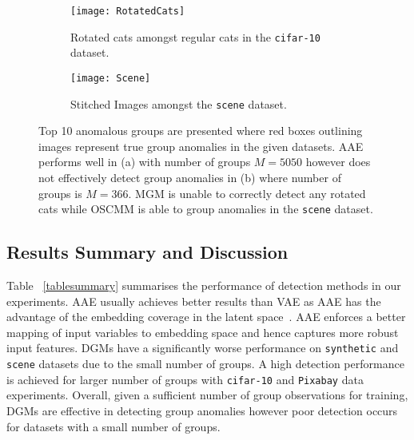 \begin{figure}[!t]
    \centering
 \begin{subfigure}[b]{1\textwidth}
\centering
   {\texttt{[image: RotatedCats]}}
\caption{Rotated cats  amongst regular cats in the {\tt cifar-10} dataset. }
 \end{subfigure}%
 \hfill \vspace{2mm}
 \begin{subfigure}[b]{1\textwidth}
\centering
 {\texttt{[image: Scene]}}
\caption{Stitched Images amongst the {\tt scene} dataset.}
        \end{subfigure}%
   \caption{Top 10 anomalous groups are presented where red boxes outlining images  represent true group anomalies in the given datasets. AAE performs well in (a) with number of groups $M=5050$ however does not effectively detect group anomalies in (b) where number of groups is $M=366$.  MGM is unable to correctly detect any rotated cats while OSCMM is able to group anomalies in the {\tt scene} dataset.
   }
    \label{fig:results-rotatedcatsandscene}
\end{figure}



\subsection{ Results Summary and Discussion}

Table  ~\ref{tablesummary} summarises the performance of detection methods in
 our experiments.
AAE usually achieves better results than VAE as AAE has the  advantage of the embedding coverage in the latent space~\cite{makhzani2015adversarial}.  AAE enforces a better mapping of input variables to embedding space and hence captures more robust input features.
DGMs have a significantly worse performance on  {\tt synthetic} and {\tt scene} datasets due to the small number of groups. A high detection performance is achieved for larger number of groups with {\tt cifar-10} and {\tt Pixabay} data experiments.
 Overall, given a sufficient number of group observations for training, DGMs are effective in detecting group anomalies however poor detection occurs for datasets with a small number of groups.







